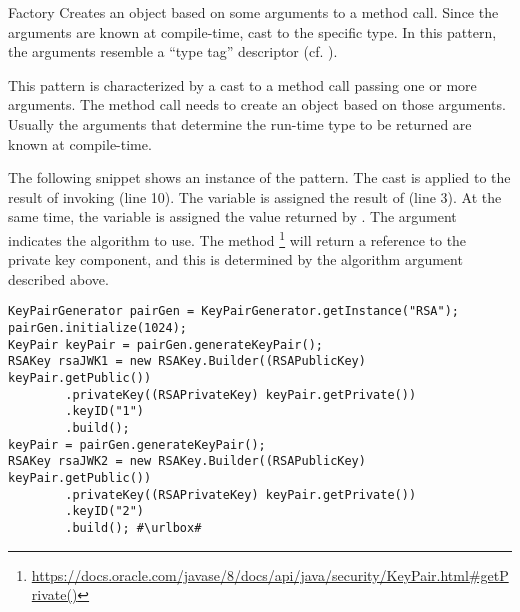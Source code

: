 \begin{pattern}{Factory}
Creates an object based on some arguments to a method call.
Since the arguments are known at compile-time, cast to the specific type.
In this pattern, the arguments resemble a ``type tag'' descriptor (cf.
).

This pattern is characterized by a cast to a method call passing one or more arguments.
The method call needs to create an object based on those arguments.
Usually the arguments that determine the run-time type to be returned are known at compile-time.

\instances{}
The following snippet
shows an instance of the \thisp{} pattern.
The cast is applied to the result of invoking 
(line 10).
The variable  is assigned the result of  (line 3).
At the same time, the  variable is assigned the value returned by .
The argument  indicates the algorithm to use.
The method%
\footnote{\url{https://docs.oracle.com/javase/8/docs/api/java/security/KeyPair.html\#getPrivate()}}
will return a reference to the private key component,
and this is determined by the algorithm argument described above.

\def\urlvar{http://bit.ly/connect2id_oauth_2_0_sdk_with_2HvRlUX}
\begin{verbatim}
KeyPairGenerator pairGen = KeyPairGenerator.getInstance("RSA");
pairGen.initialize(1024);
KeyPair keyPair = pairGen.generateKeyPair();
RSAKey rsaJWK1 = new RSAKey.Builder((RSAPublicKey) keyPair.getPublic())
        .privateKey((RSAPrivateKey) keyPair.getPrivate())
        .keyID("1")
        .build();
keyPair = pairGen.generateKeyPair();
RSAKey rsaJWK2 = new RSAKey.Builder((RSAPublicKey) keyPair.getPublic())
        .privateKey((RSAPrivateKey) keyPair.getPrivate())
        .keyID("2")
        .build(); #\urlbox#
\end{verbatim}


\end{pattern}
